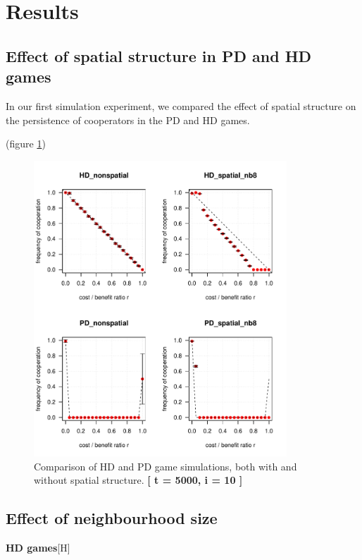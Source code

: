 
\section{Results}


\subsection{Effect of spatial structure in PD and HD games}
In our first simulation experiment, we compared the effect of spatial structure on the persistence of cooperators in the PD and HD games.


(figure \ref{fig: task1_4plot})



\begin{figure}[H]
	\centering 
	\includegraphics[width=9.5cm]{task1_4plot}
	\caption{Comparison of HD and PD game simulations, both with and without spatial structure.  \textbf{[ t = 5000, i = 10 ]} }\label{fig: task1_4plot}
\end{figure}






\subsection{Effect of neighbourhood size}


\textbf{HD games}[H] 

